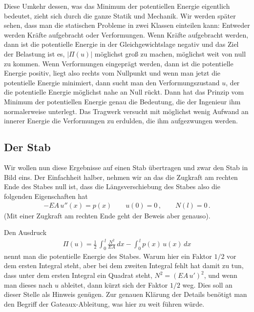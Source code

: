 Diese Umkehr dessen, was das Minimum der potentiellen Energie eigentlich bedeutet, zieht sich durch die ganze Statik und Mechanik. Wir werden sp\"{a}ter sehen, dass man die statischen Probleme in zwei Klassen einteilen kann: Ent\-weder werden Kr\"{a}fte aufgebracht oder Verformungen. Wenn Kr\"{a}fte aufgebracht werden, dann ist die potentielle Energie in der Gleichgewichtslage negativ und das Ziel der Belastung ist es, $|\Pi(u)|$ m\"{o}glichst gro{\ss} zu machen, m\"{o}glichst weit von null zu kommen. Wenn Verformungen eingepr\"{a}gt werden, dann ist die potentielle Energie positiv, liegt also rechts vom Nullpunkt und wenn man jetzt die potentielle Energie minimiert, dann sucht man den Verformungszustand $ u $, der die potentielle Energie m\"{o}glichst nahe an Null r\"{u}ckt. Dann hat das Prinzip vom Minimum der potentiellen Energie genau die Bedeutung, die der Ingenieur ihm normalerweise unterlegt. Das Tragwerk versucht mit m\"{o}glichst wenig Aufwand an innerer Energie die Verformungen zu erdulden, die ihm aufgezwungen werden.


\subsection{Der Stab}
Wir wollen nun diese Ergebnisse auf einen Stab \"{u}bertragen und zwar den Stab in Bild eins. Der Einfachheit halber, nehmen wir an das die Zugkraft am rechten Ende des Stabes null ist, dass die L\"{a}ngsverschiebung des Stabes also die folgenden Eigenschaften hat
\begin{align} \label{Eq10}
-EA\,u''(x) = p(x) \qquad u(0) = 0\,, \qquad N(l) = 0\,.
\end{align}
(Mit einer Zugkraft am rechten Ende geht der Beweis aber genauso).

Den Ausdruck
\begin{align}
\Pi(u) = \frac{1}{2}\, \int_0^{\,l} \frac{N^2}{EA}\,dx - \int_0^{\,l} p(x)\,u(x)\,dx
\end{align}
nennt man die potentielle Energie des Stabes. Warum hier ein Faktor $1/2$ vor dem ersten Integral steht, aber bei dem zweiten Integral fehlt hat damit zu tun, dass unter dem ersten Integral
ein Quadrat steht, $N^2 = (EA\,u')^2$, und wenn man dieses nach $u$ ableitet, dann k\"{u}rzt sich der Faktor $1/2$ weg.
Dies soll an dieser Stelle als Hinweis gen\"{u}gen. Zur genauen Kl\"{a}rung der Details ben\"{o}tigt man den Begriff der Gateaux-Ableitung, was hier zu weit f\"{u}hren w\"{u}rde.


